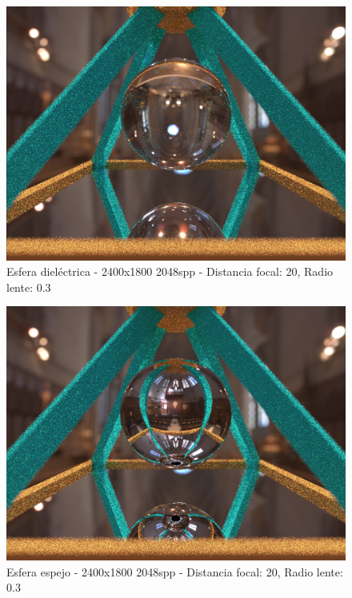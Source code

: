 \documentclass[10pt,oneside,a4paper]{article}
\begin{document}
\begin{figure}[h]
\centering
\includegraphics[width=1\linewidth]{images/escena_2400x1800_2048spp_dof20-03_screencap.png}
\caption{Esfera dieléctrica - 2400x1800 2048spp - Distancia focal: 20, Radio lente: 0.3}
\label{fig:disp}
\end{figure}

\begin{figure}[h]
\centering
\includegraphics[width=1\linewidth]{images/escenamirror_2400x1800_2048spp_dof20-03_screencap.png}
\caption{Esfera espejo - 2400x1800 2048spp - Distancia focal: 20, Radio lente: 0.3}
\label{fig:disp}
\end{figure}
\end{document}
